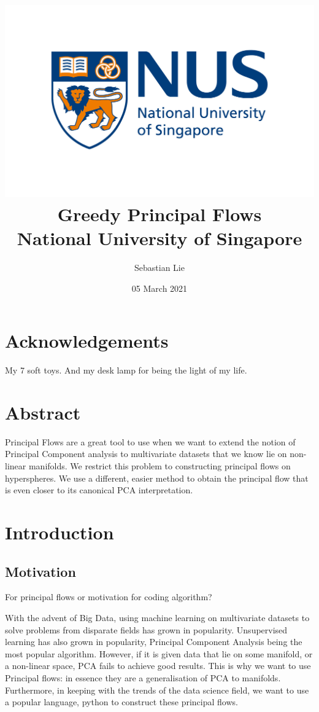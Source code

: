 \documentclass[12pt]{report}
\begin{document}
\title{
{\includegraphics[width=0.7\columnwidth]{university.jpg}}\\
{Greedy Principal Flows}\\
{\large National University of Singapore}\\
}
\author{Sebastian Lie}
\date{05 March 2021}
\maketitle

\chapter*{Acknowledgements}
My 7 soft toys. And my desk lamp for being the light of my life.

\chapter*{Abstract}
Principal Flows are a great tool to use when we want to extend the notion of Principal Component analysis to multivariate datasets that we know lie on non-linear manifolds. We restrict this problem to constructing principal flows on hyperspheres. We use a different, easier method to obtain the principal flow that is even closer to its canonical PCA interpretation. 

\newpage
\tableofcontents
\newpage

\chapter*{Introduction}

\section{Motivation}

For principal flows or motivation for coding algorithm?

With the advent of Big Data, using machine learning on multivariate datasets to solve problems from disparate fields has grown in popularity.
Unsupervised learning has also grown in popularity, Principal Component Analysis being the most popular algorithm. However, if it is given data that lie on some manifold, or a non-linear space, PCA fails to achieve good results. This is why we want to use Principal flows: in essence they are a generalisation of PCA to manifolds. Furthermore, in keeping with the trends of the data science field, we want to use a popular language, python to construct these principal flows.
\end{document}
